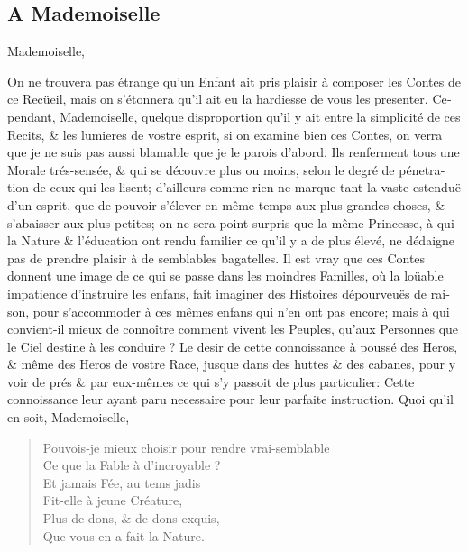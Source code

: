 \documentclass[14pt,a4paper]{memoir}
\newcommand{\notesection}[1]{%
  \addtonotes{\protect\par\protect\vspace{2ex}\protect\noindent\textbf{#1}\protect\par\protect\vspace{1ex}}%
}
\begin{document}
{{\begin{otherlanguage}{french}
\thispagestyle{plain}
\section*{A Mademoiselle}
\notesection{A Mademoiselle}

\begin{itshape}
Mademoiselle,

On ne trouvera pas étrange qu'un Enfant ait pris plaisir à
composer les Contes de ce Recüeil, mais on s'étonnera qu'il ait
eu la hardiesse de vous les presenter. Cependant, Mademoiselle,
quelque disproportion qu'il y ait entre la simplicité de ces
Recits, \& les lumieres de vostre esprit, si on examine bien ces
Contes, on verra que je ne suis pas aussi blamable que je le
parois d'abord. Ils renferment tous une Morale trés-sensée,
\& qui se découvre plus ou moins, selon le degré de pénetration
de ceux qui les lisent; d'ailleurs comme rien ne marque tant
la vaste estenduë d'un esprit, que de pouvoir s'élever en
même-temps aux plus grandes choses, \& s'abaisser aux plus
petites; on ne sera point surpris que la même Princesse, à qui
la Nature \& l'éducation ont rendu familier ce qu'il y a de
plus élevé, ne dédaigne pas de prendre plaisir à de semblables
bagatelles. Il est vray que ces Contes donnent une image de ce
qui se passe dans les moindres Familles, où la loüable impatience
d'instruire les enfans, fait imaginer des Histoires dépourveuës
de raison, pour s'accommoder à ces mêmes enfans qui n'en ont
pas encore; mais à qui convient-il mieux de connoître comment
vivent les Peuples, qu'aux Personnes que le Ciel destine à
les conduire ? Le desir de cette connoissance à poussé des Heros,
\& même des Heros de vostre Race, jusque dans des huttes \& des
cabanes, pour y voir de prés \& par eux-mêmes ce qui s'y passoit
de plus particulier: Cette connoissance leur ayant paru necessaire
pour leur parfaite instruction. Quoi qu'il en soit, Mademoiselle,

\begin{verse}
Pouvois-je mieux choisir pour rendre vrai-semblable \\
Ce que la Fable à d'incroyable ? \\
Et jamais Fée, au tems jadis \\
Fit-elle à jeune Créature, \\
Plus de dons, \& de dons exquis, \\
Que vous en a fait la Nature.
\end{verse}


\end{itshape}
\end{otherlanguage}}}
\end{document}
